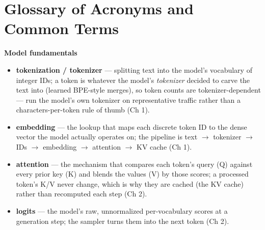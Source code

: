 \chapter{Glossary of Acronyms and Common Terms}
\label{chap:glossary}

\noindent\textbf{Model fundamentals}
\begin{itemize}\tightlist
\item \textbf{tokenization / tokenizer} — splitting text into the model's vocabulary of integer IDs; a token is whatever the model's \emph{tokenizer} decided to carve the text into (learned BPE-style merges), so token counts are tokenizer-dependent — run the model's own tokenizer on representative traffic rather than a characters-per-token rule of thumb (Ch 1).
\item \textbf{embedding} — the lookup that maps each discrete token ID to the dense vector the model actually operates on; the pipeline is text $\to$ tokenizer $\to$ IDs $\to$ embedding $\to$ attention $\to$ KV cache (Ch 1).
\item \textbf{attention} — the mechanism that compares each token's query (Q) against every prior key (K) and blends the values (V) by those scores; a processed token's K/V never change, which is why they are cached (the KV cache) rather than recomputed each step (Ch 2).
\item \textbf{logits} — the model's raw, unnormalized per-vocabulary scores at a generation step; the sampler turns them into the next token (Ch 2).
\end{itemize}

